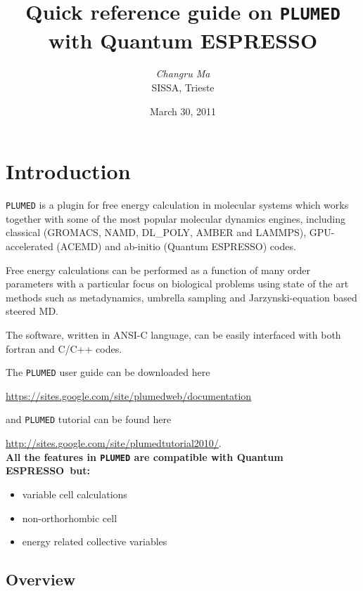 \documentclass[12pt,a4paper]{article}
\def\qe{{\sc Quantum ESPRESSO}}
\begin{document}
 
\title{Quick reference guide on \texttt{PLUMED} with \qe}
\author{{\em Changru Ma}\\
SISSA, Trieste\\
}
\date{March 30, 2011}
\maketitle
\tableofcontents
\newpage

\section{Introduction}

\texttt{PLUMED}\cite{Bonomi:2009ul} is a plugin for free energy calculation in molecular systems which works together with some of the most popular molecular dynamics engines, including classical (GROMACS, NAMD, DL\_POLY, AMBER and LAMMPS), GPU-accelerated (ACEMD) and ab-initio (\qe) codes.

Free energy calculations can be performed as a function of many order parameters with a particular focus on biological problems using state of the art methods such as metadynamics\cite{Laio:2008wu}, umbrella sampling and Jarzynski-equation based steered MD.

The software, written in ANSI-C language, can be easily interfaced with both fortran and C/C++ codes.

The \texttt{PLUMED} user guide can be downloaded here

\href{https://sites.google.com/site/plumedweb/documentation}{https://sites.google.com/site/plumedweb/documentation}

and \texttt{PLUMED} tutorial can be found here

\href{http://sites.google.com/site/plumedtutorial2010/}{http://sites.google.com/site/plumedtutorial2010/}. \\

{\bf All the features in \texttt{PLUMED} are compatible with \qe\ but:}

\begin{itemize}
\item variable cell calculations
\item non-orthorhombic cell
\item energy related collective variables
\end{itemize}

\subsection{Overview}
\end{document}
